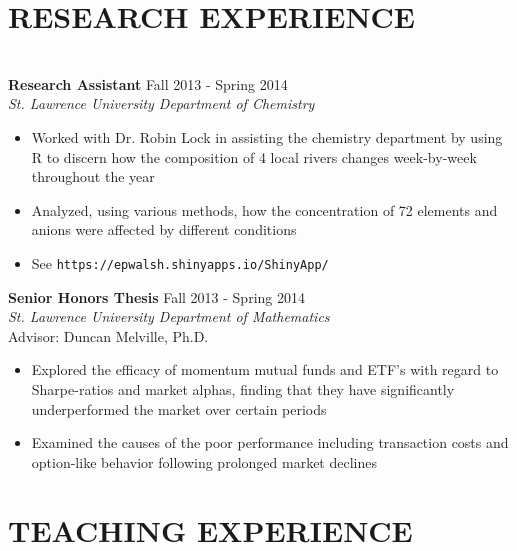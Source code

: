 \documentclass[10pt]{res} %
\begin{document}
\begin{CJK*}{UTF8}{gbsn}
\begin{resume}

\section{RESEARCH EXPERIENCE} 

\hrulefill \\
{\bf Research Assistant} \hfill Fall 2013 - Spring 2014 \\
{\sl St. Lawrence University Department of Chemistry } 
\begin{itemize} \itemsep -2pt %
\item Worked with Dr. Robin Lock in assisting the chemistry department by using R to discern how the composition of 4 local rivers changes week-by-week throughout the year
\item Analyzed, using various methods, how the concentration of 72 elements and anions were affected by different conditions
\item See \texttt{https://epwalsh.shinyapps.io/ShinyApp/}
\end{itemize}

{\bf Senior Honors Thesis }\hfill Fall 2013 - Spring 2014 \\
{\sl St. Lawrence University Department of Mathematics } \\
Advisor: Duncan Melville, Ph.D.
\begin{itemize} \itemsep -2pt
\item Explored the efficacy of momentum mutual funds and ETF's with regard to Sharpe-ratios and market alphas, finding that they have significantly underperformed the market over certain periods
\item Examined the causes of the poor performance including transaction costs and option-like behavior following prolonged market declines
\end{itemize}


\section{TEACHING EXPERIENCE}


\end{resume}
\end{CJK*}
\end{document}
